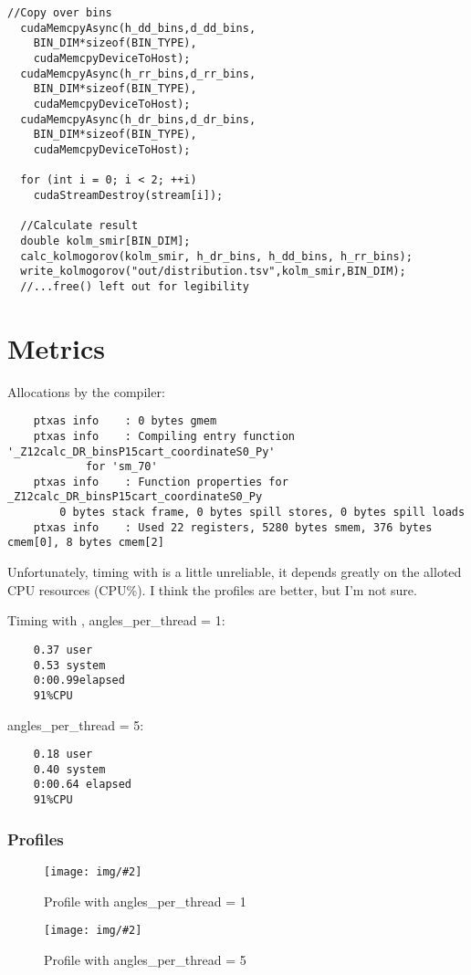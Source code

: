 \documentclass[a4paper,titlepage,12pt]{article}
\newcommand{\img}[3][0.95]{
        \begin{figure}[h]
                \centering
                \texttt{[image: img/\#2]}
                \caption{#3}
                \label{fig:#2}
        \end{figure}
}
\begin{document}
\begin{description}[left = \parindent]
\begin{lstlisting}[caption=The main function]
  //Copy over bins
  cudaMemcpyAsync(h_dd_bins,d_dd_bins,
  	BIN_DIM*sizeof(BIN_TYPE),
	cudaMemcpyDeviceToHost);
  cudaMemcpyAsync(h_rr_bins,d_rr_bins,
  	BIN_DIM*sizeof(BIN_TYPE),
	cudaMemcpyDeviceToHost);
  cudaMemcpyAsync(h_dr_bins,d_dr_bins,
  	BIN_DIM*sizeof(BIN_TYPE),
	cudaMemcpyDeviceToHost);

  for (int i = 0; i < 2; ++i)
    cudaStreamDestroy(stream[i]);

  //Calculate result
  double kolm_smir[BIN_DIM];
  calc_kolmogorov(kolm_smir, h_dr_bins, h_dd_bins, h_rr_bins);
  write_kolmogorov("out/distribution.tsv",kolm_smir,BIN_DIM);
  //...free() left out for legibility
\end{lstlisting}
\newpage

\section{Metrics}

Allocations by the compiler:

\begin{verbatim}
	ptxas info    : 0 bytes gmem
	ptxas info    : Compiling entry function '_Z12calc_DR_binsP15cart_coordinateS0_Py'
	        for 'sm_70'
	ptxas info    : Function properties for _Z12calc_DR_binsP15cart_coordinateS0_Py
	    0 bytes stack frame, 0 bytes spill stores, 0 bytes spill loads
	ptxas info    : Used 22 registers, 5280 bytes smem, 376 bytes cmem[0], 8 bytes cmem[2]
\end{verbatim}

\noindent Unfortunately, timing with  is a little unreliable, it depends greatly on the alloted CPU resources (CPU\%).
I think the profiles are better, but I'm not sure.

\vspace{0.5cm}
\noindent Timing with ,
angles\_per\_thread = 1:
\begin{verbatim} 
	0.37 user
	0.53 system
	0:00.99elapsed
	91%CPU
\end{verbatim}

\vspace{0.5cm}

\noindent angles\_per\_thread = 5:
\begin{verbatim}
	0.18 user
	0.40 system
	0:00.64 elapsed
	91%CPU
\end{verbatim}
\subsubsection{Profiles}
\img{B1_prof}{Profile with angles\_per\_thread = 1}
\img{interleaved_synch}{Profile with angles\_per\_thread = 5}


\end{description}
\end{document}
